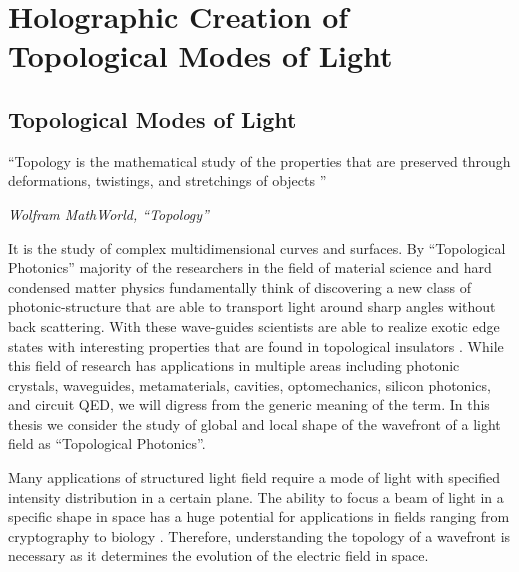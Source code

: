 \chapter{Holographic Creation of Topological Modes of Light}
\label{ch:topological_modes}

\section{Topological Modes of Light}

\setlength{\epigraphwidth}{0.8\textwidth}
\epigraph{``Topology is the mathematical study of the properties that are preserved through deformations, twistings, and stretchings of objects \cite{topology}''}{\textit{Wolfram MathWorld, ``Topology''}}

It is the study of complex multidimensional curves and surfaces. By ``Topological Photonics'' \cite{leykam2016, Zhou_2017} majority of the researchers in the field of material science and hard condensed matter physics fundamentally think of discovering a new class of photonic-structure \cite{Barik666} that are able to transport light around sharp angles without back scattering. With these wave-guides scientists are able to realize exotic edge states with interesting properties that are found  in topological insulators \cite{hsieh2008, haldane20107}. While this field of research has applications in multiple areas \cite{ozawa2019} including photonic crystals, waveguides, metamaterials, cavities, optomechanics, silicon photonics, and circuit QED, we will digress from the generic meaning of the term. In this thesis we consider the study of global and local shape of the wavefront of a light field as ``Topological Photonics''. 

Many applications of structured light field require a mode of light with specified intensity distribution in a certain plane. The ability to focus a beam of light in a specific shape in space has a huge potential for applications in fields ranging from cryptography \cite{Horstmeyer2013, Horstmeyer2013cleo} to biology \cite{wang2012, Papadopoulos:12}. Therefore, understanding the topology of a wavefront is necessary as it determines the evolution of the electric field in space. 

